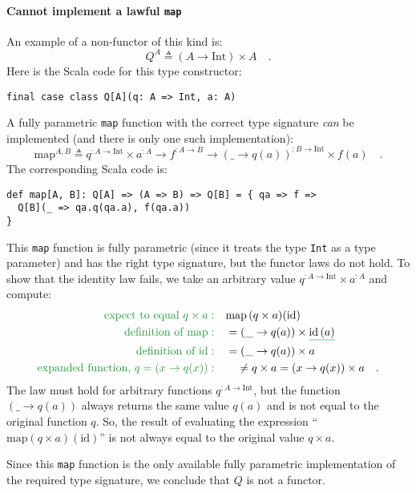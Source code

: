 \paragraph{Cannot implement a lawful \texttt{map}}

An example of a non-functor of this kind is:
\[
Q^{A}\triangleq\left(A\rightarrow\text{Int}\right)\times A\quad.
\]
Here is the Scala code for this type constructor:
\begin{lstlisting}
final case class Q[A](q: A => Int, a: A)
\end{lstlisting}
A fully parametric \lstinline!map! function with the correct type
signature \emph{can} be implemented (and there is only one such implementation):
\[
\text{map}^{A,B}\triangleq q^{:A\rightarrow\text{Int}}\times a^{:A}\rightarrow f^{:A\rightarrow B}\rightarrow(\_\rightarrow q(a))^{:B\rightarrow\text{Int}}\times f(a)\quad.
\]
The corresponding Scala code is:
\begin{lstlisting}
def map[A, B]: Q[A] => (A => B) => Q[B] = { qa => f =>
  Q[B](_ => qa.q(qa.a), f(qa.a)) 
}
\end{lstlisting}
This \lstinline!map! function is fully parametric (since it treats
the type \lstinline!Int! as a type parameter) and has the right type
signature, but the functor laws do not hold. To show that the identity
law fails, we take an arbitrary value $q^{:A\rightarrow\text{Int}}\times a^{:A}$
and compute:
\begin{align*}
{\color{greenunder}\text{expect to equal }q\times a:}\quad & \text{map}\,(q\times a)(\text{id})\\
{\color{greenunder}\text{definition of }\text{map}:}\quad & =(\_\rightarrow q(a))\times\gunderline{\text{id}\,(a)}\\
{\color{greenunder}\text{definition of }\text{id}:}\quad & =(\_\rightarrow q(a))\times a\\
{\color{greenunder}\text{expanded function, }q=\left(x\rightarrow q(x)\right):}\quad & \quad\neq q\times a=(x\rightarrow q(x))\times a\quad.
\end{align*}
The law must hold for arbitrary functions $q^{:A\rightarrow\text{Int}}$,
but the function $\left(\_\rightarrow q(a)\right)$ always returns
the same value $q(a)$ and is not equal to the original function $q$.
So, the result of evaluating the expression \textsf{``}$\text{map}(q\times a)(\text{id})$\textsf{''}
is not always equal to the original value $q\times a$. 

Since this \lstinline!map! function is the only available fully parametric
implementation of the required type signature, we conclude that $Q$
is not a functor.

